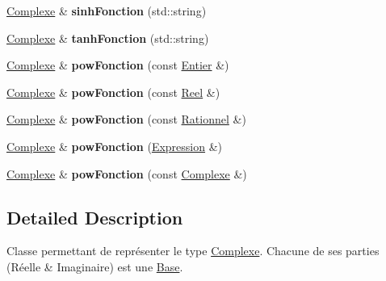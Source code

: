 \begin{DoxyCompactItemize}
\item 
\hypertarget{class_complexe_a7568b17feb57979a9e4e7124add5b748}{\hyperlink{class_complexe}{Complexe} \& {\bfseries sinh\-Fonction} (std\-::string)}\label{class_complexe_a7568b17feb57979a9e4e7124add5b748}

\item 
\hypertarget{class_complexe_a36fdf178593fc28651c4b19c5abfa03a}{\hyperlink{class_complexe}{Complexe} \& {\bfseries tanh\-Fonction} (std\-::string)}\label{class_complexe_a36fdf178593fc28651c4b19c5abfa03a}

\item 
\hypertarget{class_complexe_a88399a019d3a1acd7ecd2bbfa7b19674}{\hyperlink{class_complexe}{Complexe} \& {\bfseries pow\-Fonction} (const \hyperlink{class_entier}{Entier} \&)}\label{class_complexe_a88399a019d3a1acd7ecd2bbfa7b19674}

\item 
\hypertarget{class_complexe_a083ffc2f19c4a8b2ca45cb574337d39b}{\hyperlink{class_complexe}{Complexe} \& {\bfseries pow\-Fonction} (const \hyperlink{class_reel}{Reel} \&)}\label{class_complexe_a083ffc2f19c4a8b2ca45cb574337d39b}

\item 
\hypertarget{class_complexe_a45212d194eed3e1984a215aa319c76d6}{\hyperlink{class_complexe}{Complexe} \& {\bfseries pow\-Fonction} (const \hyperlink{class_rationnel}{Rationnel} \&)}\label{class_complexe_a45212d194eed3e1984a215aa319c76d6}

\item 
\hypertarget{class_complexe_aaa0a23fd4ef264b8929a378b4a529c57}{\hyperlink{class_complexe}{Complexe} \& {\bfseries pow\-Fonction} (\hyperlink{class_expression}{Expression} \&)}\label{class_complexe_aaa0a23fd4ef264b8929a378b4a529c57}

\item 
\hypertarget{class_complexe_a0aa584da80d7291bec0984db5c37f097}{\hyperlink{class_complexe}{Complexe} \& {\bfseries pow\-Fonction} (const \hyperlink{class_complexe}{Complexe} \&)}\label{class_complexe_a0aa584da80d7291bec0984db5c37f097}

\end{DoxyCompactItemize}


\subsection{Detailed Description}
Classe permettant de représenter le type \hyperlink{class_complexe}{Complexe}. Chacune de ses parties (Réelle \& Imaginaire) est une \hyperlink{class_base}{Base}. 


